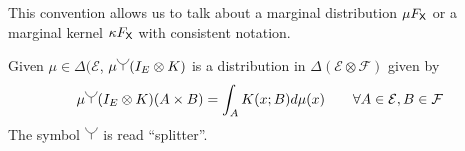 This convention allows us to talk about a marginal distribution $\mu F_{\mathsf{X}}$ or a marginal kernel $\kappa F_{\mathsf{X}}$ with consistent notation.

Given $\mu\in \Delta(\mathcal{E}$, $\mu\splitter{0.15}(I_E\otimes K)$ is a distribution in $\Delta(\mathcal{E}\otimes\mathcal{F})$ given by
\begin{align}
    \mu\splitter{0.15}(I_E\otimes K)(A\times B) = \int_A K(x;B) d\mu(x)\qquad \forall A\in \mathcal{E},B\in \mathcal{F}
\end{align}
The symbol $\splitter{0.15}$ is read ``splitter''.





